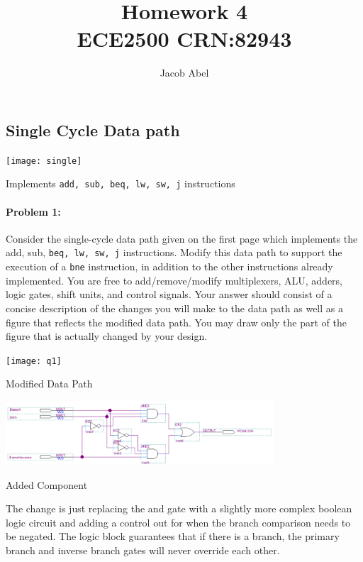 \documentclass[12pt,letterpaper,titlepage]{article}
\author{Jacob Abel}
\title{	Homework 4
	\\\large ECE2500 CRN:82943
}
\begin{document}
\maketitle
\begin{raggedright}

\section{Single Cycle Data path}
\begin{center}
\texttt{[image: single]}

Implements \texttt{add, sub, beq, lw, sw, j} instructions
\end{center}

\clearpage

\paragraph{Problem 1: }
Consider the single-cycle data path given on the first page which implements the add, sub, \texttt{beq, lw, sw, j} instructions. Modify this data path to support the execution of a \texttt{bne} instruction, in addition to the other instructions already implemented. You are free to add/remove/modify multiplexers, ALU, adders, logic gates, shift units, and control signals. Your answer should consist of a concise description of the changes you will make to the data path as well as a figure that reflects the modified data path. You may draw only the part of the figure that is actually changed by your design.
\begin{center}
\texttt{[image: q1]}

Modified Data Path

\includegraphics[width=0.75\textwidth, height=\textheight, keepaspectratio=true]{q1_0}

Added Component

\end{center}

The change is just replacing the and gate with a slightly more complex boolean logic circuit and adding a control out for when the branch comparison needs to be negated. The logic block guarantees that if there is a branch, the primary branch and inverse branch gates will never override each other.


\end{raggedright}
\end{document}
